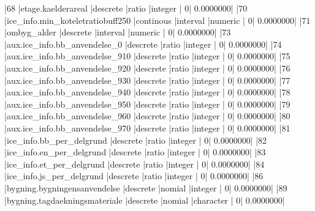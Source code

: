\documentclass{report}
\begin{document}
\begin{Schunk}
\begin{Soutput}
|68  |etage.kaelderareal                                            |descrete           |ratio          |integer         |              0|          0.0000000|
|70  |ice_info.min_koteletratiobuff250                              |continous          |interval       |numeric         |              0|          0.0000000|
|71  |ombyg_alder                                                   |descrete           |interval       |numeric         |              0|          0.0000000|
|73  |aux.ice_info.bb_anvendelse_0                                  |descrete           |ratio          |integer         |              0|          0.0000000|
|74  |aux.ice_info.bb_anvendelse_910                                |descrete           |ratio          |integer         |              0|          0.0000000|
|75  |aux.ice_info.bb_anvendelse_920                                |descrete           |ratio          |integer         |              0|          0.0000000|
|76  |aux.ice_info.bb_anvendelse_930                                |descrete           |ratio          |integer         |              0|          0.0000000|
|77  |aux.ice_info.bb_anvendelse_940                                |descrete           |ratio          |integer         |              0|          0.0000000|
|78  |aux.ice_info.bb_anvendelse_950                                |descrete           |ratio          |integer         |              0|          0.0000000|
|79  |aux.ice_info.bb_anvendelse_960                                |descrete           |ratio          |integer         |              0|          0.0000000|
|80  |aux.ice_info.bb_anvendelse_970                                |descrete           |ratio          |integer         |              0|          0.0000000|
|81  |ice_info.bb_per_delgrund                                      |descrete           |ratio          |integer         |              0|          0.0000000|
|82  |ice_info.en_per_delgrund                                      |descrete           |ratio          |integer         |              0|          0.0000000|
|83  |ice_info.et_per_delgrund                                      |descrete           |ratio          |integer         |              0|          0.0000000|
|84  |ice_info.js_per_delgrund                                      |descrete           |ratio          |integer         |              0|          0.0000000|
|86  |bygning.bygningensanvendelse                                  |descrete           |nomial         |integer         |              0|          0.0000000|
|89  |bygning.tagdaekningsmateriale                                 |descrete           |nomial         |character       |              0|          0.0000000|

\end{Soutput}
\end{Schunk}
\end{document}
